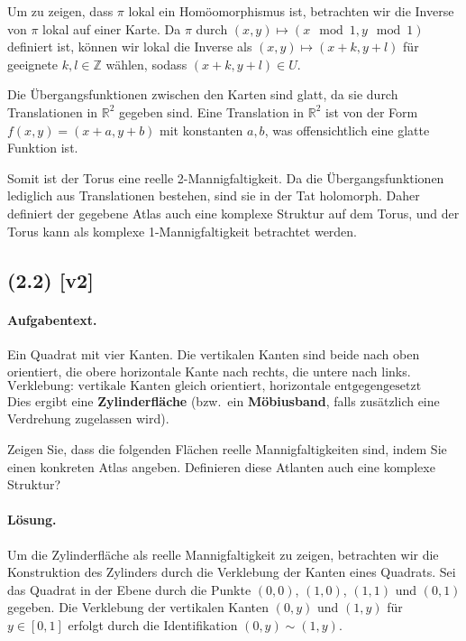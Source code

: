 \documentclass[11pt,a4paper]{article}
\begin{document}
Um zu zeigen, dass \(\pi\) lokal ein Homöomorphismus ist, betrachten wir die Inverse von \(\pi\) lokal auf einer Karte. Da \(\pi\) durch \((x,y) \mapsto (x \mod 1, y \mod 1)\) definiert ist, können wir lokal die Inverse als \((x,y) \mapsto (x+k, y+l)\) für geeignete \(k, l \in \mathbb{Z}\) wählen, sodass \((x+k, y+l) \in U\).

Die Übergangsfunktionen zwischen den Karten sind glatt, da sie durch Translationen in \(\mathbb{R}^2\) gegeben sind. Eine Translation in \(\mathbb{R}^2\) ist von der Form \(f(x,y) = (x+a, y+b)\) mit konstanten \(a, b\), was offensichtlich eine glatte Funktion ist.

Somit ist der Torus eine reelle 2-Mannigfaltigkeit. Da die Übergangsfunktionen lediglich aus Translationen bestehen, sind sie in der Tat holomorph. Daher definiert der gegebene Atlas auch eine komplexe Struktur auf dem Torus, und der Torus kann als komplexe 1-Mannigfaltigkeit betrachtet werden.


\subsection*{(2.2) [v2]}
\paragraph{Aufgabentext.}
Ein Quadrat mit vier Kanten. 
Die vertikalen Kanten sind beide nach oben orientiert, 
die obere horizontale Kante nach rechts, 
die untere nach links.  
\[
\text{Verklebung: vertikale Kanten gleich orientiert, horizontale entgegengesetzt orientiert.}
\]
Dies ergibt eine \textbf{Zylinderfläche} 
(bzw.\ ein \textbf{Möbiusband}, falls zusätzlich eine Verdrehung zugelassen wird).

Zeigen Sie, dass die folgenden Flächen reelle Mannigfaltigkeiten sind, indem Sie einen konkreten Atlas angeben. Definieren diese Atlanten auch eine komplexe Struktur?

\paragraph{Lösung.}
Um die Zylinderfläche als reelle Mannigfaltigkeit zu zeigen, betrachten wir die Konstruktion des Zylinders durch die Verklebung der Kanten eines Quadrats. Sei das Quadrat in der Ebene durch die Punkte \((0,0)\), \((1,0)\), \((1,1)\) und \((0,1)\) gegeben. Die Verklebung der vertikalen Kanten \((0,y)\) und \((1,y)\) für \(y \in [0,1]\) erfolgt durch die Identifikation \((0,y) \sim (1,y)\).
\end{document}
